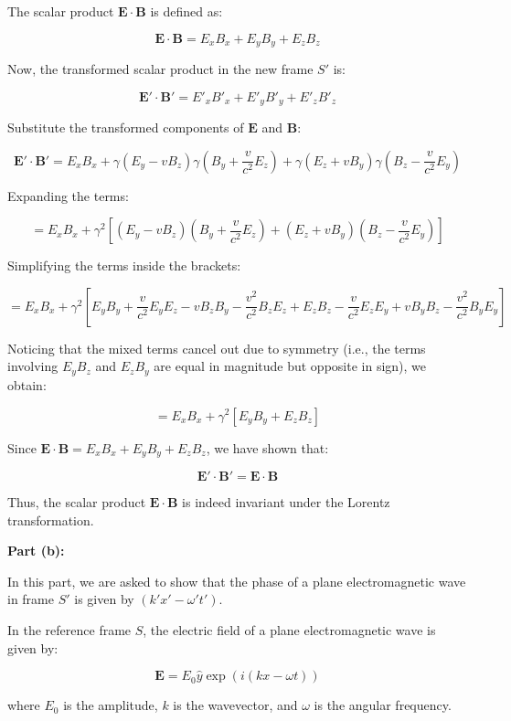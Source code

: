 The scalar product \( \mathbf{E} \cdot \mathbf{B} \) is defined as:

\[
\mathbf{E} \cdot \mathbf{B} = E_x B_x + E_y B_y + E_z B_z
\]

Now, the transformed scalar product in the new frame \( S' \) is:

\[
\mathbf{E'} \cdot \mathbf{B'} = E'_x B'_x + E'_y B'_y + E'_z B'_z
\]

Substitute the transformed components of \( \mathbf{E} \) and \( \mathbf{B} \):

\[
\mathbf{E'} \cdot \mathbf{B'} = E_x B_x + \gamma (E_y - v B_z) \gamma \left( B_y + \frac{v}{c^2} E_z \right) + \gamma (E_z + v B_y) \gamma \left( B_z - \frac{v}{c^2} E_y \right)
\]

Expanding the terms:

\[
= E_x B_x + \gamma^2 \left[ (E_y - v B_z) (B_y + \frac{v}{c^2} E_z) + (E_z + v B_y) (B_z - \frac{v}{c^2} E_y) \right]
\]

Simplifying the terms inside the brackets:

\[
= E_x B_x + \gamma^2 \left[ E_y B_y + \frac{v}{c^2} E_y E_z - v B_z B_y - \frac{v^2}{c^2} B_z E_z + E_z B_z - \frac{v}{c^2} E_z E_y + v B_y B_z - \frac{v^2}{c^2} B_y E_y \right]
\]

Noticing that the mixed terms cancel out due to symmetry (i.e., the terms involving \( E_y B_z \) and \( E_z B_y \) are equal in magnitude but opposite in sign), we obtain:

\[
= E_x B_x + \gamma^2 \left[ E_y B_y + E_z B_z \right]
\]

Since \( \mathbf{E} \cdot \mathbf{B} = E_x B_x + E_y B_y + E_z B_z \), we have shown that:

\[
\mathbf{E'} \cdot \mathbf{B'} = \mathbf{E} \cdot \mathbf{B}
\]

Thus, the scalar product \( \mathbf{E} \cdot \mathbf{B} \) is indeed invariant under the Lorentz transformation.

\textbf{Part (b):}

In this part, we are asked to show that the phase of a plane electromagnetic wave in frame \( S' \) is given by \( (k' x' - \omega' t') \).

In the reference frame \( S \), the electric field of a plane electromagnetic wave is given by:

\[
\mathbf{E} = E_0 \hat{y} \exp \left( i (k x - \omega t) \right)
\]

where \( E_0 \) is the amplitude, \( k \) is the wavevector, and \( \omega \) is the angular frequency.


